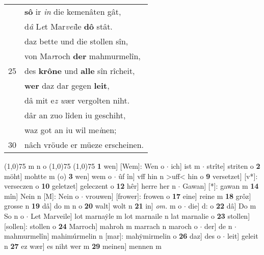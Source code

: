 \documentclass[8pt,a4paper,notitlepage]{article}
\begin{document}
\begin{table}[ht]
\begin{minipage}[t]{0.5\linewidth}
\begin{tabular}{rl}
 & \textbf{sô} ir \textit{in} die kemenâten gât,\\ 
 & d\textit{â} L\textit{e}t Mar\textit{vei}le \textbf{dô} stât.\\ 
 & daz bette und die stollen sîn,\\ 
 & von Ma\textit{r}roch \textbf{der} mahmurmelîn,\\ 
25 & des \textbf{krône} und \textbf{alle} sîn rîcheit,\\ 
 & \textbf{wer} daz dar gegen \textbf{leit},\\ 
 & dâ mit e\textit{z} \textit{w}ær vergolten niht.\\ 
 & dâr an zuo lîden iu geschiht,\\ 
 & waz got an iu wil me\textit{i}nen;\\ 
30 & nâch vröude er müeze erscheinen.\\ 
\end{tabular}
\scriptsize
\line(1,0){75} \newline
m n o \newline
\line(1,0){75} \newline
\newline
\line(1,0){75} \newline
\textbf{1} wen] [Wem]: Wen o  $\cdot$ ich] ist m  $\cdot$ strîte] striten o \textbf{2} möht] mohtte m (o) \textbf{3} wen] wem o  $\cdot$ ûf în] vff hin n >uff< hin o \textbf{9} versetzet] [v*]: verseczen o \textbf{10} geletzet] geleczent o \textbf{12} hêr] herre her n  $\cdot$ Gawan] [*]: gawan m \textbf{14} mîn] Nein n [M]: Nein o  $\cdot$ vrouwen] [frower]: frowen o \textbf{17} eine] reine m \textbf{18} grôz] grosse n \textbf{19} dâ] do m n o \textbf{20} walt] wolt n \textbf{21} in] \textit{om.} m o  $\cdot$ die] d: o \textbf{22} dâ] Do m So n o  $\cdot$ Let Marveile] lot marnaẏle m lot marnaile n lat marnalie o \textbf{23} stollen] [sollen]: stollen o \textbf{24} Marroch] mahroh m marrach n maroch o  $\cdot$ der] de n  $\cdot$ mahmurmelîn] mahimúrmelin n [mar]: mahẏmirmelin o \textbf{26} daz] des o  $\cdot$ leit] geleit n \textbf{27} ez wær] es niht wer m \textbf{29} meinen] mennen m \newline
\end{minipage}
\end{table}
\newpage
\end{document}
